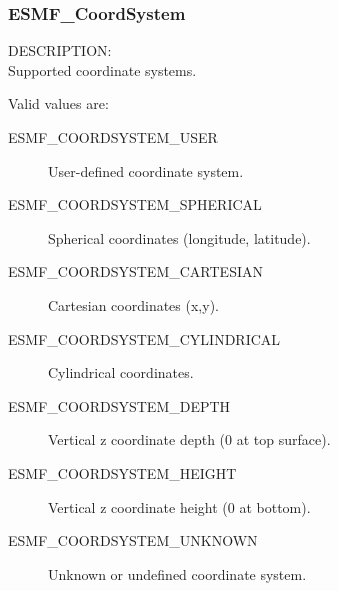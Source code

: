 \subsubsection{ESMF\_CoordSystem}

{\sf DESCRIPTION:\\}
Supported coordinate systems.

Valid values are:
\begin{description}
   \item [ESMF\_COORDSYSTEM\_USER]
         User-defined coordinate system.

   \item [ESMF\_COORDSYSTEM\_SPHERICAL]
         Spherical coordinates (longitude, latitude).

   \item [ESMF\_COORDSYSTEM\_CARTESIAN]
         Cartesian coordinates (x,y).

   \item [ESMF\_COORDSYSTEM\_CYLINDRICAL] 
         Cylindrical coordinates.

   \item [ESMF\_COORDSYSTEM\_DEPTH]
         Vertical z coordinate depth (0 at top surface).

   \item [ESMF\_COORDSYSTEM\_HEIGHT]
         Vertical z coordinate height (0 at bottom).

   \item [ESMF\_COORDSYSTEM\_UNKNOWN]
         Unknown or undefined coordinate system.
\end{description}

